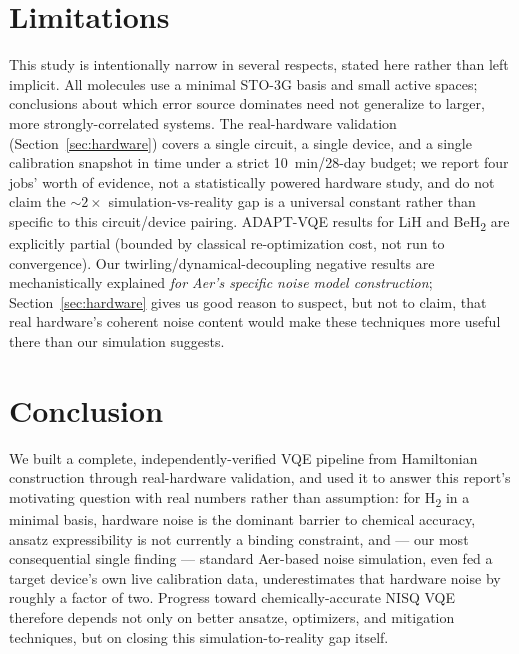 \documentclass[11pt]{article}
\begin{document}
\section{Limitations}
This study is intentionally narrow in several respects, stated here rather
than left implicit. All molecules use a minimal STO-3G basis and small active
spaces; conclusions about which error source dominates need not generalize to
larger, more strongly-correlated systems. The real-hardware validation
(Section~\ref{sec:hardware}) covers a single circuit, a single device, and a
single calibration snapshot in time under a strict \qty{10}{\minute}/28-day
budget; we report four jobs' worth of evidence, not a statistically powered
hardware study, and do not claim the $\sim\!2\times$ simulation-vs-reality gap
is a universal constant rather than specific to this circuit/device pairing.
ADAPT-VQE results for LiH and BeH\textsubscript{2} are explicitly partial
(bounded by classical re-optimization cost, not run to convergence). Our
twirling/dynamical-decoupling negative results are mechanistically explained
\emph{for Aer's specific noise model construction}; Section~\ref{sec:hardware}
gives us good reason to suspect, but not to claim, that real hardware's
coherent noise content would make these techniques more useful there than our
simulation suggests.

\section{Conclusion}
We built a complete, independently-verified VQE pipeline from Hamiltonian
construction through real-hardware validation, and used it to answer this
report's motivating question with real numbers rather than assumption: for
H\textsubscript{2} in a minimal basis, hardware noise is the dominant barrier
to chemical accuracy, ansatz expressibility is not currently a binding
constraint, and --- our most consequential single finding --- standard
Aer-based noise simulation, even fed a target device's own live calibration
data, underestimates that hardware noise by roughly a factor of two. Progress
toward chemically-accurate NISQ VQE therefore depends not only on better
ansatze, optimizers, and mitigation techniques, but on closing this
simulation-to-reality gap itself.

\printbibliography
\end{document}
